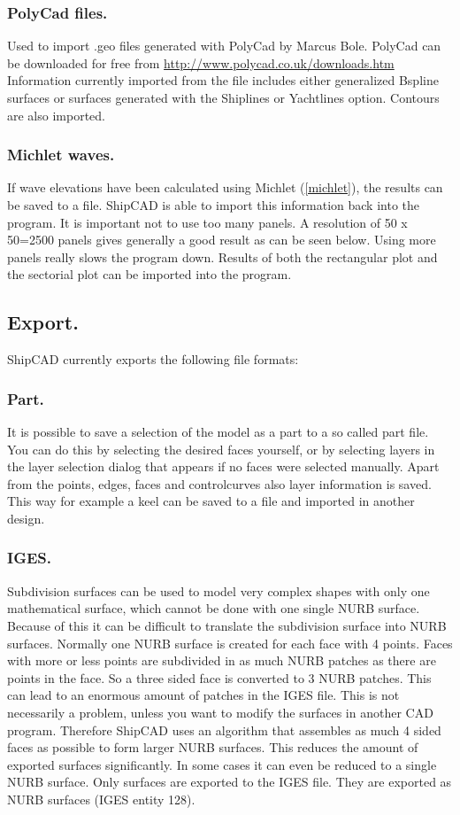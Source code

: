 \documentclass[12pt]{article}
\begin{document}
\subsubsection{PolyCad files.}
Used to import .geo files generated with PolyCad by Marcus
Bole. PolyCad can be downloaded for free
from \url{http://www.polycad.co.uk/downloads.htm} Information
currently imported from the file includes either generalized Bspline
surfaces or surfaces generated with the Shiplines or Yachtlines
option. Contours are also imported.

\subsubsection{Michlet waves.} \label{michlet-waves}
If wave elevations have been calculated using Michlet (\ref{michlet}),
the results can be saved to a file. ShipCAD is able to import this
information back into the program. It is important not to use too many
panels. A resolution of 50 x 50=2500 panels gives generally a good
result as can be seen below. Using more panels really slows the
program down. Results of both the rectangular plot and the sectorial
plot can be imported into the program.

\subsection{Export.}
ShipCAD currently exports the following file formats:

\subsubsection{Part.} \label{part}
It is possible to save a selection of the model as a part to a so
called part file. You can do this by selecting the desired faces
yourself, or by selecting layers in the layer selection dialog that
appears if no faces were selected manually. Apart from the points,
edges, faces and controlcurves also layer information is saved. This
way for example a keel can be saved to a file and imported in another
design.

\subsubsection{IGES.}
Subdivision surfaces can be used to model very complex shapes with
only one mathematical surface, which cannot be done with one single
NURB surface. Because of this it can be difficult to translate the
subdivision surface into NURB surfaces. Normally one NURB surface is
created for each face with 4 points. Faces with more or less points
are subdivided in as much NURB patches as there are points in the
face. So a three sided face is converted to 3 NURB patches. This can
lead to an enormous amount of patches in the IGES file. This is not
necessarily a problem, unless you want to modify the surfaces in
another CAD program. Therefore ShipCAD uses an algorithm that
assembles as much 4 sided faces as possible to form larger NURB
surfaces. This reduces the amount of exported surfaces
significantly. In some cases it can even be reduced to a single NURB
surface. Only surfaces are exported to the IGES file. They are
exported as NURB surfaces (IGES entity 128).
\end{document}
